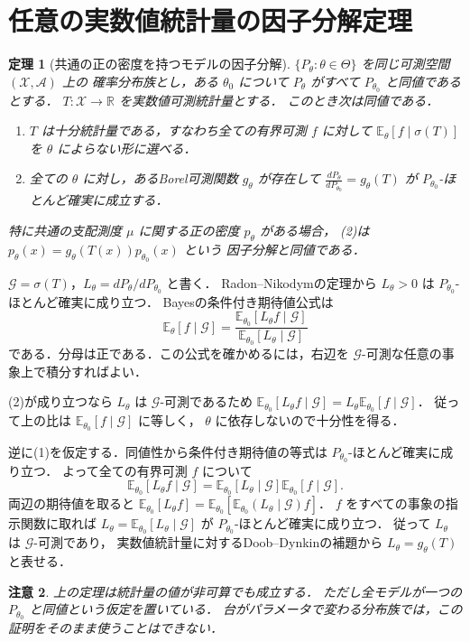 \documentclass[a5paper,10pt,onecolumn]{jsarticle}
\makeatletter
\theoremstyle{mathnotetheorem}
\newtheorem{theorem}{定理}[section]
\newtheorem{remark}[theorem]{注意}
\renewcommand{\proofname}{証明}
\renewenvironment{proof}[1][\proofname]{%
  \par\pushQED{\qed}\normalfont\topsep4\p@\@plus2\p@\relax
  \trivlist\item[\hskip\labelsep\bfseries #1]\ignorespaces
}{\popQED\endtrivlist\@endpefalse}
\makeatother
\begin{document}
\section{任意の実数値統計量の因子分解定理}
\begin{theorem}[共通の正の密度を持つモデルの因子分解]
$\{P_\theta:\theta\in\Theta\}$ を同じ可測空間 $(\mathcal X,\mathcal A)$ 上の
確率分布族とし，ある $\theta_0$ について
$P_\theta$ がすべて $P_{\theta_0}$ と同値であるとする．
$T:\mathcal X\to\mathbb R$ を実数値可測統計量とする．
このとき次は同値である．
\begin{enumerate}
\item $T$ は十分統計量である，すなわち全ての有界可測 $f$ に対して
$\mathbb E_\theta[f\mid\sigma(T)]$ を $\theta$ によらない形に選べる．
\item 全ての $\theta$ に対し，あるBorel可測関数 $g_\theta$ が存在して
$\displaystyle \frac{dP_\theta}{dP_{\theta_0}}=g_\theta(T)$ が
$P_{\theta_0}$-ほとんど確実に成立する．
\end{enumerate}
特に共通の支配測度 $\mu$ に関する正の密度 $p_\theta$ がある場合，
(2)は $p_\theta(x)=g_\theta(T(x))p_{\theta_0}(x)$ という
因子分解と同値である．
\end{theorem}
\begin{proof}
$\mathcal G=\sigma(T)$，$L_\theta=dP_\theta/dP_{\theta_0}$ と書く．
Radon--Nikodymの定理から $L_\theta>0$ は $P_{\theta_0}$-ほとんど確実に成り立つ．
Bayesの条件付き期待値公式は
\[
 \mathbb E_\theta[f\mid\mathcal G]
 =\frac{\mathbb E_{\theta_0}[L_\theta f\mid\mathcal G]}
 {\mathbb E_{\theta_0}[L_\theta\mid\mathcal G]}
\]
である．分母は正である．この公式を確かめるには，右辺を
$\mathcal G$-可測な任意の事象上で積分すればよい．

(2)が成り立つなら $L_\theta$ は $\mathcal G$-可測であるため
$\mathbb E_{\theta_0}[L_\theta f\mid\mathcal G]
=L_\theta\mathbb E_{\theta_0}[f\mid\mathcal G]$．
従って上の比は $\mathbb E_{\theta_0}[f\mid\mathcal G]$ に等しく，
$\theta$ に依存しないので十分性を得る．

逆に(1)を仮定する．同値性から条件付き期待値の等式は
$P_{\theta_0}$-ほとんど確実に成り立つ．
よって全ての有界可測 $f$ について
\[
 \mathbb E_{\theta_0}[L_\theta f\mid\mathcal G]
 =\mathbb E_{\theta_0}[L_\theta\mid\mathcal G]
 \mathbb E_{\theta_0}[f\mid\mathcal G].
\]
両辺の期待値を取ると
$\mathbb E_{\theta_0}[L_\theta f]
=\mathbb E_{\theta_0}[\mathbb E_{\theta_0}(L_\theta\mid\mathcal G)f]$．
$f$ をすべての事象の指示関数に取れば
$L_\theta=\mathbb E_{\theta_0}[L_\theta\mid\mathcal G]$ が
$P_{\theta_0}$-ほとんど確実に成り立つ．
従って $L_\theta$ は $\mathcal G$-可測であり，
実数値統計量に対するDoob--Dynkinの補題から
$L_\theta=g_\theta(T)$ と表せる．
\end{proof}
\begin{remark}
上の定理は統計量の値が非可算でも成立する．
ただし全モデルが一つの $P_{\theta_0}$ と同値という仮定を置いている．
台がパラメータで変わる分布族では，この証明をそのまま使うことはできない．
\end{remark}
\end{document}
